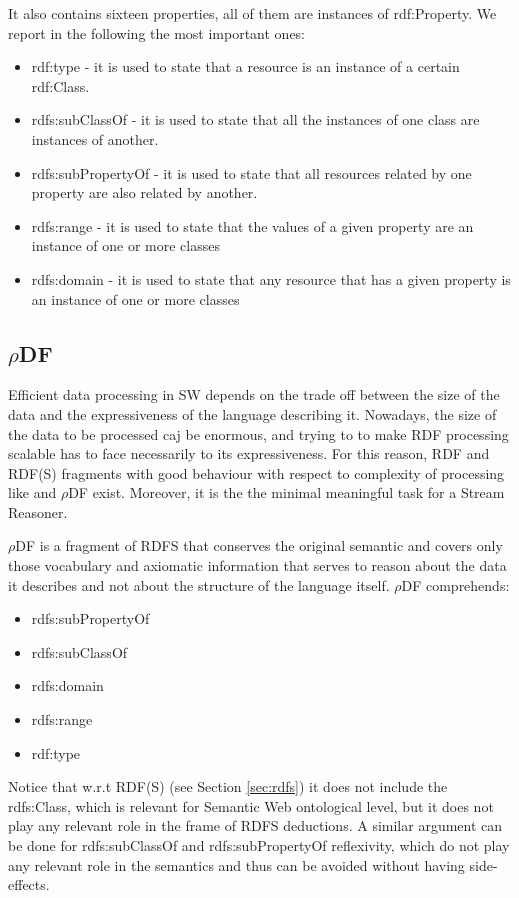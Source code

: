 It also contains sixteen properties, all of them are instances of rdf:Property. We report in the following the most important ones:
\begin{itemize}
\item rdf:type - it is used to state that a resource is an instance of a certain rdf:Class.
\item rdfs:subClassOf - it is used to state that all the instances of one class are instances of another.
\item rdfs:subPropertyOf - it is used to state that all resources related by one property are also related by another.
\item rdfs:range - it is used to state that the values of a given property are an instance of one or more classes
\item rdfs:domain - it is used to state that any resource that has a given property is an instance of one or more classes
\end{itemize}


\subsection{$\rho$DF}\label{sec:rhodf}

Efficient data processing in SW depends on the trade off between the size of the data and the expressiveness of the language describing it. Nowadays, the size of the data to be processed caj be enormous, and trying to to make RDF processing scalable has to face necessarily to its expressiveness. For this reason, RDF and RDF(S) fragments with good behaviour with respect to complexity of processing like and $\rho$DF \cite{DBLP:conf/esws/MunozPG07} exist. Moreover, it is the the minimal meaningful task for a Stream Reasoner.

$\rho$DF is a fragment of RDFS that conserves the original semantic and covers only those vocabulary and axiomatic information that  serves to reason about the data it describes and not about the structure of the language itself. $\rho$DF comprehends:
\begin{itemize}
\item rdfs:subPropertyOf
\item rdfs:subClassOf
\item rdfs:domain 
\item rdfs:range
\item rdf:type 
\end{itemize}

Notice that w.r.t RDF(S) (see Section \ref{sec:rdfs}) it does not include the rdfs:Class, which is relevant for Semantic Web ontological level, but it does not play any relevant role in the frame of RDFS deductions. A similar argument can be done for rdfs:subClassOf and rdfs:subPropertyOf reflexivity, which do not play any relevant role in the semantics and thus can be avoided without having side-effects.

